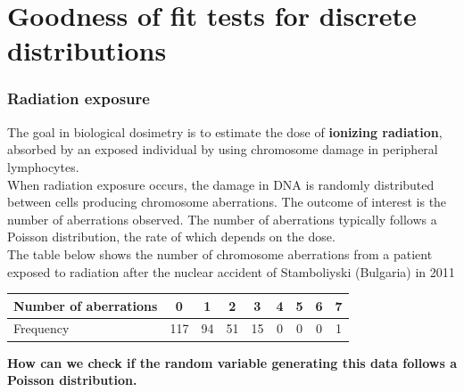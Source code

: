 \documentclass[a4paper]{article}\usepackage[]{graphicx}\usepackage[]{xcolor}
\begin{document}
\section{Goodness of fit tests for discrete distributions}\label{sec:4}
\subsubsection{Radiation exposure}
The goal in biological dosimetry is to estimate the dose of \textcolor{myred}{\textbf{ionizing radiation}}, absorbed by an exposed individual by using chromosome damage in peripheral lymphocytes.\\
When radiation exposure occurs, the damage in DNA is randomly distributed between cells producing chromosome aberrations. The outcome of interest is the number of aberrations observed. The number of aberrations typically follows a Poisson distribution, the rate of which depends on the dose.\\
The table below shows the number of chromosome aberrations from a patient exposed to radiation after the nuclear accident of Stamboliyski (Bulgaria) in 2011
\begin{table}[H]
	\centering
	\begin{tabular}{@{}lcccccccc@{}}
	\toprule
	Number of aberrations & 0   & 1  & 2  & 3  & 4 & 5 & 6 & 7 \\ \midrule
	Frequency             & 117 & 94 & 51 & 15 & 0 & 0 & 0 & 1 \\ \bottomrule
	\end{tabular}
\end{table}
\begin{greenbox}
	\textbf{How can we check if the random variable generating this data follows a Poisson distribution.}
\end{greenbox}
\end{document}
